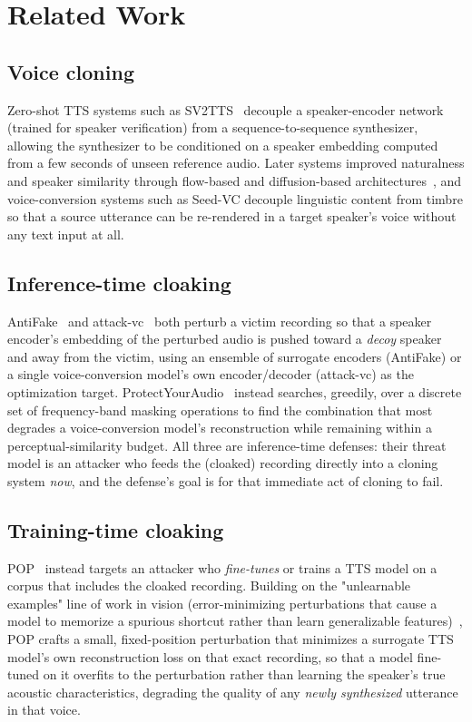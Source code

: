 \documentclass[11pt]{article}
\begin{document}
\section{Related Work}
\label{sec:related}

\subsection{Voice cloning}
Zero-shot TTS systems such as SV2TTS~\cite{jia2018transfer} decouple a
speaker-encoder network (trained for speaker verification) from a
sequence-to-sequence synthesizer, allowing the synthesizer to be
conditioned on a speaker embedding computed from a few seconds of
unseen reference audio. Later systems improved naturalness and speaker
similarity through flow-based and diffusion-based
architectures~\cite{kim2021vits, chen2024f5tts}, and voice-conversion
systems such as Seed-VC decouple linguistic content from timbre so
that a source utterance can be re-rendered in a target speaker's voice
without any text input at all.

\subsection{Inference-time cloaking}
AntiFake~\cite{yu2023antifake} and attack-vc~\cite{huang2021defending}
both perturb a victim recording so that a speaker encoder's embedding
of the perturbed audio is pushed toward a \emph{decoy} speaker and away
from the victim, using an ensemble of surrogate encoders (AntiFake) or
a single voice-conversion model's own encoder/decoder (attack-vc) as
the optimization target. ProtectYourAudio~\cite{liu2023protecting}
instead searches, greedily, over a discrete set of frequency-band
masking operations to find the combination that most degrades a
voice-conversion model's reconstruction while remaining within a
perceptual-similarity budget. All three are inference-time defenses:
their threat model is an attacker who feeds the (cloaked) recording
directly into a cloning system \emph{now}, and the defense's goal is
for that immediate act of cloning to fail.

\subsection{Training-time cloaking}
POP~\cite{zhang2024mitigating} instead targets an attacker who
\emph{fine-tunes} or trains a TTS model on a corpus that includes the
cloaked recording. Building on the "unlearnable examples" line of
work in vision (error-minimizing perturbations that cause a model to
memorize a spurious shortcut rather than learn generalizable
features)~\cite{huang2021unlearnable}, POP crafts a small,
fixed-position perturbation that minimizes a surrogate TTS model's own
reconstruction loss on that exact recording, so that a model
fine-tuned on it overfits to the perturbation rather than learning the
speaker's true acoustic characteristics, degrading the quality of any
\emph{newly synthesized} utterance in that voice.
\end{document}
